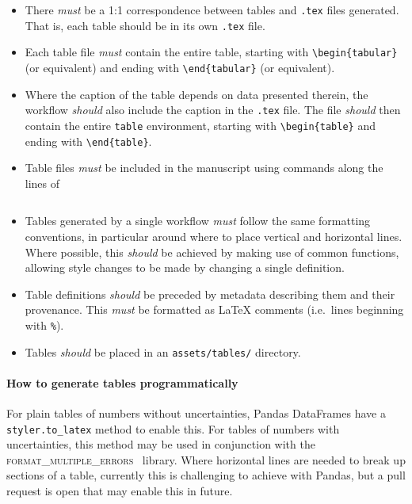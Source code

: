 \documentclass{article}
\newcommand\rfcword[1]{\emph{#1}\xspace}
\newcommand\must{\rfcword{must}}
\newcommand\should{\rfcword{should}}
\newcommand\filename[1]{\texttt{#1}\xspace}
\newcommand\program[1]{\textsc{#1}\xspace}
\begin{document}
\begin{itemize}
  \item
        There \must be a 1:1 correspondence between tables and \filename{.tex} files generated.
        That is,
        each table should be in its own \filename{.tex} file.
  \item
        Each table file \must contain the entire table,
        starting with \verb|\begin{tabular}|
        (or equivalent)
        and ending with \verb|\end{tabular}|
        (or equivalent).
  \item
        Where the caption of the table depends on data presented therein,
        the workflow \should also include the caption in the \filename{.tex} file.
        The file \should then contain the entire \verb|table| environment,
        starting with \verb|\begin{table}|
        and ending with \verb|\end{table}|.
  \item
        Table files \must be included in the manuscript using commands along the lines of
\begin{verbatim}

\end{verbatim}
  \item
        Tables generated by a single workflow
        \must follow the same formatting conventions,
        in particular around where to place vertical and horizontal lines.
        Where possible,
        this \should be achieved by making use of common functions,
        allowing style changes to be made by changing a single definition.
  \item
        Table definitions \should be preceded by metadata describing them and their provenance.
        This \must be formatted as LaTeX comments
        (i.e.\ lines beginning with \verb|%|).
  \item
        Tables \should be placed in an \filename{assets/tables/} directory.
\end{itemize}

\paragraph{How to generate tables programmatically}

For plain tables of numbers without uncertainties,
Pandas DataFrames have a \verb|styler.to_latex| method to enable this.
For tables of numbers with uncertainties,
this method may be used in conjunction with
the \program{format\_multiple\_errors}~\cite{fme} library.
Where horizontal lines are needed to break up sections of a table,
currently this is challenging to achieve with Pandas,
but a pull request is open that may enable this in future.
\end{document}
